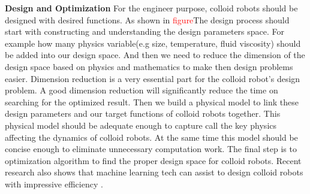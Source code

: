\textbf{Design and Optimization} For the engineer purpose, colloid robots should be designed with desired functions. \cite{liebchen2019optimal} As shown in \textcolor{red}{figure}The design process should start with constructing and understanding the design parameters space. For example how many physics variable(e.g size, temperature, fluid viscosity) should be added into our design space. And then we  need to reduce the dimension of the design space based on physics and mathematics to make then design problems easier. Dimension reduction is a very essential part for the colloid robot's design problem. A good dimension reduction will significantly reduce the time on searching for the optimized result. Then we build a physical model to link these design parameters and our target functions of colloid robots together. This physical model should be adequate enough  to capture call the key physics affecting the dynamics of colloid robots. At the same time this model should be concise enough to eliminate unnecessary computation work. The final step is to optimization algorithm to find the proper design space for colloid robots.\cite{ward1963hierarchical,nocedal2006numerical} Recent research also shows that machine learning tech can assist to design colloid robots with impressive efficiency .\cite{yang2020micro,yang2020cargo,yang2019deep,tsang2018self}



